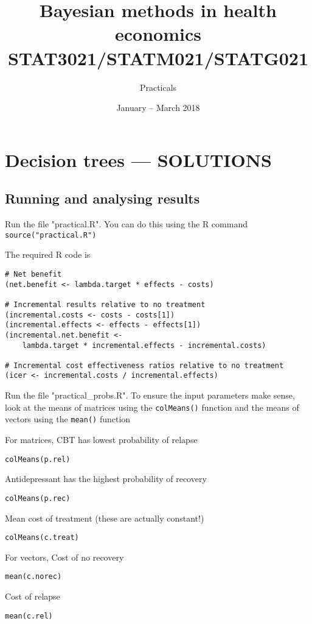 \documentclass[a4paper,twoside,openany]{../svmonoBUGS}\usepackage[]{graphicx}\usepackage[]{color}
\title{Bayesian methods in health economics \\ STAT3021/STATM021/STATG021}
\author{Practicals}
\date{January -- March 2018}
\begin{document}
\addtocounter{chapter}{7}
\chapter{Decision trees --- SOLUTIONS}

%
\section{Running and analysing results}

Run the file "practical.R".
You can do this using the R command \texttt{source("practical.R")}

The required R code is 

\begin{verbatim}
# Net benefit
(net.benefit <- lambda.target * effects - costs)

# Incremental results relative to no treatment
(incremental.costs <- costs - costs[1])
(incremental.effects <- effects - effects[1])
(incremental.net.benefit <-
    lambda.target * incremental.effects - incremental.costs)

# Incremental cost effectiveness ratios relative to no treatment
(icer <- incremental.costs / incremental.effects)
\end{verbatim}

Run the file "practical\_probs.R".
To ensure the input parameters make sense, look at the means of matrices using the \texttt{colMeans()} function
and the means of vectors using the \texttt{mean()} function

For matrices, CBT has lowest probability of relapse
\begin{verbatim}
colMeans(p.rel)
\end{verbatim}

Antidepressant has the highest probability of recovery
\begin{verbatim}
colMeans(p.rec)
\end{verbatim}

Mean cost of treatment (these are actually constant!)
\begin{verbatim}
colMeans(c.treat)
\end{verbatim}

For vectors, Cost of no recovery
\begin{verbatim}
mean(c.norec)
\end{verbatim}

Cost of relapse
\begin{verbatim}
mean(c.rel)
\end{verbatim}
\end{document}
